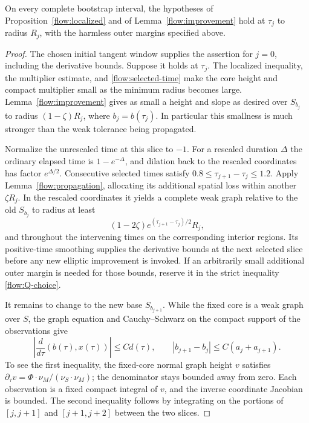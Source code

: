\begin{lemma}\label{flow:radius-induction}
On every complete bootstrap interval, the hypotheses of
Proposition~\ref{flow:localized} and of
Lemma~\ref{flow:improvement} hold at $\tau_j$ to radius $R_j$,
with the harmless outer margins specified above.
\end{lemma}

\begin{proof}
The chosen initial tangent window supplies the assertion for
$j=0$, including the derivative bounds.  Suppose it holds at
$\tau_j$.  The localized inequality, the multiplier estimate,
and \eqref{flow:selected-time} make the core height and compact
multiplier small as the minimum radius becomes large.
Lemma~\ref{flow:improvement} gives as small a height and slope
as desired over $S_{b_j}$ to radius $(1-\zeta)R_j$, where
$b_j=b(\tau_j)$.  In particular this smallness is much stronger
than the weak tolerance being propagated.

Normalize the unrescaled time at this slice to $-1$.
For a rescaled duration $\Delta$ the ordinary elapsed time is
$1-e^{-\Delta}$, and dilation back to the rescaled coordinates
has factor $e^{\Delta/2}$.  Consecutive selected times satisfy
$0.8\le\tau_{j+1}-\tau_j\le1.2$.  Apply
Lemma~\ref{flow:propagation}, allocating its additional spatial
loss within another $\zeta R_j$.  In the rescaled coordinates
it yields a complete weak graph relative to the old $S_{b_j}$
to radius at least
\begin{equation}\label{flow:radius-gain}
 (1-2\zeta)e^{(\tau_{j+1}-\tau_j)/2}R_j,
\end{equation}
and throughout the intervening times on the corresponding
interior regions.  Its positive-time smoothing supplies the
derivative bounds at the next selected slice before any new
elliptic improvement is invoked.  If an arbitrarily small
additional outer margin is needed for those bounds, reserve
it in the strict inequality \eqref{flow:Q-choice}.

It remains to change to the new base $S_{b_{j+1}}$.  While the
fixed core is a weak graph over $S$, the graph equation and
Cauchy--Schwarz on the compact support of the observations give
\begin{equation}\label{flow:observation-motion}
 \left|\frac{d}{d\tau}(b(\tau),x(\tau))\right|
       \le C d(\tau),\qquad
 |b_{j+1}-b_j|\le C(a_j+a_{j+1}).
\end{equation}
To see the first inequality, the fixed-core normal graph height
$v$ satisfies $\partial_\tau v=\Phi\cdot\nu_M/(\nu_S\cdot\nu_M)$;
the denominator stays bounded away from zero.  Each observation
is a fixed compact integral of $v$, and the inverse coordinate
Jacobian is bounded.  The second inequality follows by
integrating on the portions of $[j,j+1]$ and $[j+1,j+2]$ between
the two slices.


\end{proof}
